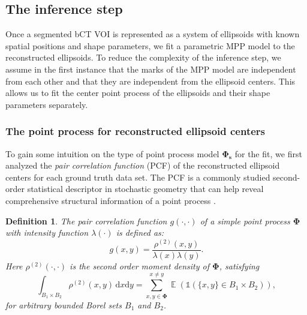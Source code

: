 \documentclass[journal]{IEEEtran}
\DeclareMathOperator{\E}{\mathbb{E}}%
\newcommand{\dd}[1]{\mathrm{d}#1}%
\newtheorem{define}{Definition}[section]%
\begin{document}
\setcounter{table}{0}

\subsection{The inference step}
\label{sec:infer-step:-fitt}

Once a segmented bCT VOI is represented as a system of ellipsoids with
known spatial positions and shape parameters, we fit a parametric MPP
model to the reconstructed ellipsoids. To reduce the complexity of the
inference step, we assume in the first instance that the marks of the
MPP model are independent from each other and that they are
independent from the ellipsoid centers. This allows us to fit the
center point process of the ellipsoids and their shape parameters
separately.

\subsubsection{The point process for reconstructed ellipsoid centers}
\label{sec:point-proc-reconstr}

To gain some intuition on the type of point process model
$\mathbf{\Phi_s}$ for the fit, we first analyzed the \textit{pair
  correlation function} (PCF) of the reconstructed ellipsoid centers
for each ground truth data set. The PCF is a commonly studied
second-order statistical descriptor in stochastic geometry that can
help reveal comprehensive structural information of a point process
\cite{baddeley2007spatial}.

\begin{define}

  The pair correlation function \textit{$g(\cdot, \cdot)$} of a simple
  point process $\mathbf{\Phi}$ with intensity function
  $\lambda(\cdot)$ is defined as:
  \begin{equation}
    \label{eq:pcf-official-def}
    g(x,y)=\frac{\rho^{(2)}(x,y)}{\lambda(x) \lambda(y)}.
  \end{equation}
  Here $\rho^{(2)}(\cdot, \cdot)$ is the second order moment density
  of $\mathbf{\Phi}$, satisfying
  \begin{equation}
    \label{eq:second-order-moment}
    \int_{B_{1} \times B_{2}} \rho^{(2)}(x,y) \, \dd x \dd y
    = \sum^{x \neq y}_{x,y \in \mathbf{\Phi}} \E \left( \mathds{1} (
      \{x,y \} \in B_{1} \times B_{2} ) \right),
  \end{equation}
  for arbitrary bounded Borel sets $B_1$ and $B_2$.
\end{define}
\end{document}
